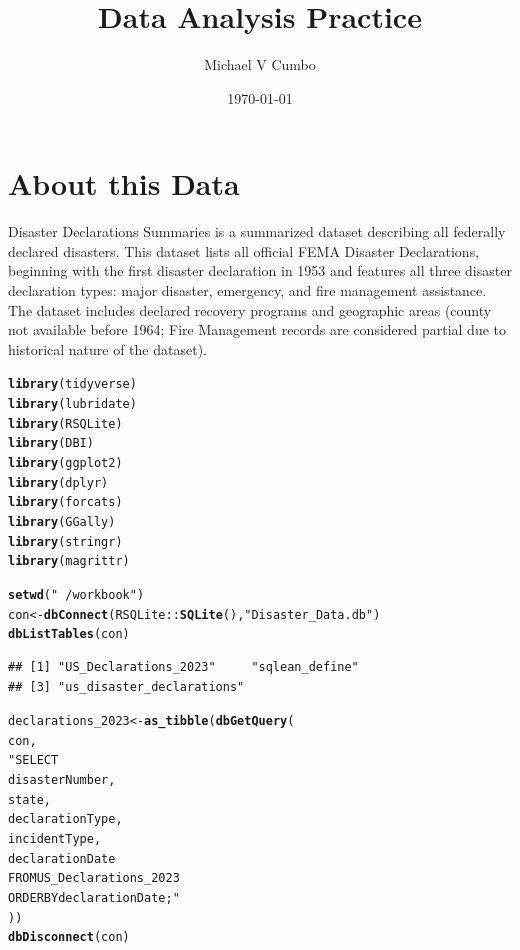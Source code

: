 \documentclass[11pt]{article}\usepackage[]{graphicx}\usepackage[]{xcolor}
\title{\textbf{Data Analysis Practice}}
\author{Michael V Cumbo}
\date{\today}
\makeatletter
\newcommand{\hlstr}[1]{\textcolor[rgb]{0.192,0.494,0.8}{#1}}%
\newcommand{\hlopt}[1]{\textcolor[rgb]{0,0,0}{#1}}%
\newcommand{\hlstd}[1]{\textcolor[rgb]{0.345,0.345,0.345}{#1}}%
\newcommand{\hlkwb}[1]{\textcolor[rgb]{0.69,0.353,0.396}{#1}}%
\newcommand{\hlkwd}[1]{\textcolor[rgb]{0.737,0.353,0.396}{\textbf{#1}}}%
\newenvironment{kframe}{%
 \def\at@end@of@kframe{}%
 \ifinner\ifhmode%
  \def\at@end@of@kframe{\end{minipage}}%
  \begin{minipage}{\columnwidth}%
 \fi\fi%
 \def\FrameCommand##1{\hskip\@totalleftmargin \hskip-\fboxsep
 \colorbox{shadecolor}{##1}\hskip-\fboxsep
     \hskip-\linewidth \hskip-\@totalleftmargin \hskip\columnwidth}%
 \MakeFramed {\advance\hsize-\width
   \@totalleftmargin\z@ \linewidth\hsize
   \@setminipage}}%
 {\par\unskip\endMakeFramed%
 \at@end@of@kframe}
\newenvironment{knitrout}{}{} %
\makeatother
\begin{document}
\maketitle
\section{About this Data}
\begin{center}
\indent\parbox{15cm}{
  Disaster Declarations Summaries is a summarized dataset describing all federally declared disasters. This dataset lists all official FEMA Disaster Declarations, beginning with the first disaster declaration in 1953 and features all three disaster declaration types: major disaster, emergency, and fire management assistance. The dataset includes declared recovery programs and geographic areas (county not available before 1964; Fire Management records are considered partial due to historical nature of the dataset).
}
\end{center}
\begin{knitrout}
\color{fgcolor}\begin{kframe}
\begin{alltt}
\hlkwd{library}\hlstd{(tidyverse)}
\hlkwd{library}\hlstd{(lubridate)}
\hlkwd{library}\hlstd{(RSQLite)}
\hlkwd{library}\hlstd{(DBI)}
\hlkwd{library}\hlstd{(ggplot2)}
\hlkwd{library}\hlstd{(dplyr)}
\hlkwd{library}\hlstd{(forcats)}
\hlkwd{library}\hlstd{(GGally)}
\hlkwd{library}\hlstd{(stringr)}
\hlkwd{library}\hlstd{(magrittr)}

\hlkwd{setwd}\hlstd{(}\hlstr{"~/workbook"}\hlstd{)}
\hlstd{con} \hlkwb{<-} \hlkwd{dbConnect}\hlstd{(RSQLite}\hlopt{::}\hlkwd{SQLite}\hlstd{(),} \hlstr{"Disaster_Data.db"}\hlstd{)}
\hlkwd{dbListTables}\hlstd{(con)}
\end{alltt}
\begin{verbatim}
## [1] "US_Declarations_2023"     "sqlean_define"           
## [3] "us_disaster_declarations"
\end{verbatim}
\begin{alltt}
\hlstd{declarations_2023} \hlkwb{<-} \hlkwd{as_tibble}\hlstd{(}\hlkwd{dbGetQuery}\hlstd{(}
  \hlstd{con,}
  \hlstr{"SELECT
  disasterNumber,
  state,
  declarationType,
  incidentType,
  declarationDate
  FROM US_Declarations_2023
ORDER BY declarationDate;"}
\hlstd{))}
\hlkwd{dbDisconnect}\hlstd{(con)}
\end{alltt}
\end{kframe}
\end{knitrout}
\end{document}
